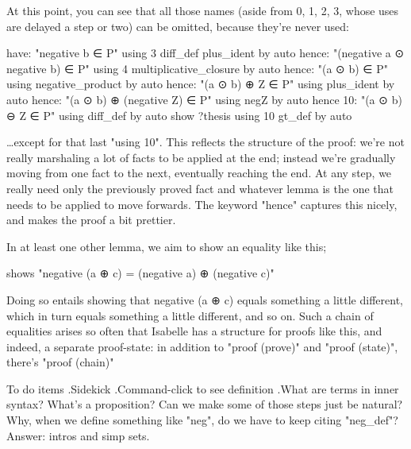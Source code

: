 At this point, you can see that all those names (aside from 0, 1, 2, 3, whose uses are delayed a step or two) can be omitted, because they're never used:

  have: "negative b ∈ P" using 3 diff_def plus_ident by auto
  hence: "(negative a  ⊙  negative b) ∈ P"  using 4  multiplicative_closure  by auto
  hence:  "(a  ⊙  b) ∈ P" using negative_product by auto
  hence:  "(a  ⊙  b) ⊕ Z ∈ P" using plus_ident by auto
  hence:  "(a  ⊙  b) ⊕ (negative Z) ∈ P" using negZ by auto
  hence 10:  "(a  ⊙  b)  ⊖  Z ∈ P" using diff_def by auto
  show ?thesis using 10 gt_def by auto 

…except for that last "using 10". This reflects the structure of the proof: we're not really marshaling a lot of facts to be applied at the end; instead we're gradually moving from one fact to the next, eventually reaching the end. At any step, we really need only the previously proved fact and whatever lemma is the one that needs to be applied to move forwards. The keyword "hence" captures this nicely, and makes the proof a bit prettier. 

In at least one other lemma, we aim to show an equality like this;

  shows "negative (a  ⊕ c) = (negative a)  ⊕ (negative c)"

Doing so entails showing that negative (a  ⊕ c) equals something a little different, which in turn equals something a little different, and so on. Such a chain of equalities arises so often that Isabelle has a structure for proofs like this, and indeed, a separate proof-state: in addition to "proof (prove)" and "proof (state)", there's "proof (chain)"


To do items
.Sidekick
.Command-click to see definition
.What are terms in inner syntax? What's a proposition? 
Can we make some of those steps just be natural? Why, when we define something like "neg", do we have to keep citing "neg_def"? Answer: intros and simp sets. 


